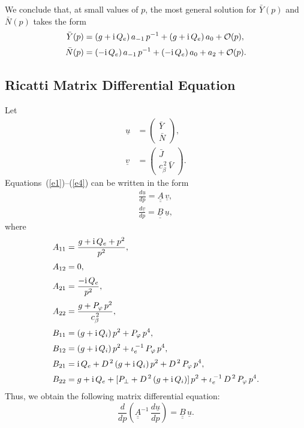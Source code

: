 \documentclass[12pt,prb,aps]{revtex4-1}
\begin{document}
We conclude that, at small values of $p$, the most general solution for $\bar{Y}(p)$ and $\bar{N}(p)$ takes the form 
\begin{align}\label{yy}
\bar{Y}(p) &= (g+{\rm i}\,Q_e)\,a_{-1} \,p^{-1}+(g+{\rm i}\,Q_e) \,a_0+ {\cal O}(p),\\[0.5ex]
\bar{N}(p) &= (-{\rm i}\,Q_e)\,a_{-1}\,p^{-1} + (-{\rm i}\,Q_e)\,a_0 + a_2 + {\cal O}(p).\label{nn}
\end{align}

\subsection{Ricatti Matrix Differential Equation}
Let
\begin{align}
\underline{u}&= \left(\begin{array}{c}\bar{Y}\\\bar{N}\end{array}\right),\\[0.5ex]
\underline{v}&= \left(\begin{array}{c}\bar{J}\\c_\beta^{\,2}\,\bar{V}\end{array}\right).
\end{align}
Equations~(\ref{e1})--(\ref{e4}) can be written in the form 
\begin{align}
\frac{d\underline{u}}{dp}= \underline{\underline{A}}\,\underline{v},\\[0.5ex]
\frac{d\underline{v}}{dp}= \underline{\underline{B}}\,\underline{u},
\end{align}
where
\begin{align}
A_{11} &=  \frac{g+{\rm i}\,Q_e+p^2}{p^2},\\[0.5ex]
A_{12}&=0,\\[0.5ex]
A_{21} &= \frac{-{\rm i}\,Q_e}{p^2},\\[0.5ex]
A_{22} &= \frac{g + P_\varphi\,p^2}{c_\beta^{\,2}},\\[0.5ex]
B_{11} &= (g+{\rm i}\,Q_i)\,p^2 + P_\varphi\,p^4,\\[0.5ex]
B_{12} &= (g+{\rm i}\,Q_i)\,p^2 + \iota_e^{\,-1}\,P_\varphi\,p^4,\\[0.5ex]
B_{21}&= {\rm i}\,Q_e+ D^{\,2}\,(g+{\rm i}\,Q_i)\,p^2 + D^{\,2}\,P_\varphi\,p^4,\\[0.5ex]
B_{22} & =g+{\rm i}\,Q_e + [P_\perp + D^{\,2}\,(g + {\rm i}\,Q_i)]\,p^2 + \iota_e^{\,-1}\,D^{\,2}\,P_\varphi\,p^4.
\end{align}
Thus, we obtain the following matrix differential equation: 
\begin{equation}\label{mat}
\frac{d}{dp}\!\left(\underline{\underline{A}}^{-1}\,\frac{d\underline{u}}{dp}\right) = \underline{\underline{B}}\,\underline{u}.
\end{equation}
\end{document}
